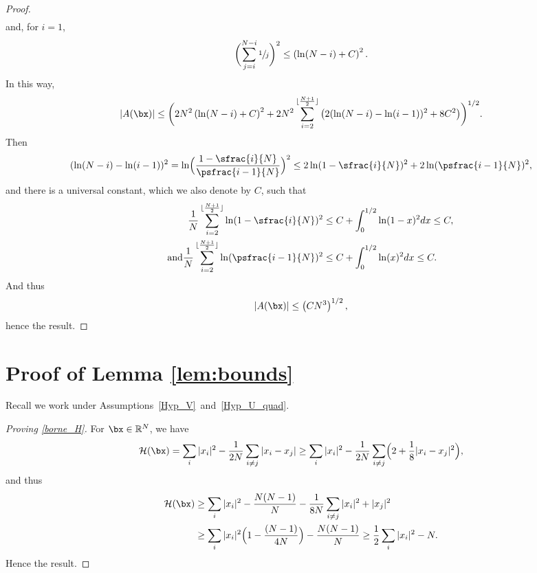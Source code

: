 \begin{proof}
\begin{align*}
\end{align*}
and, for $i=1$,\vspace*{-5pt}
\begin{align*}
\biggl(\sum_{j=i}^{N-i}\sfrac{1}{j}\biggr)^2\leq\left(\ln(N-i)+C\right)^2.
\end{align*}
In this way,\vspace*{-5pt}
\[
|A(\bx)|\leq\biggl(2N^2\left(\ln(N-i)+C\right)^2
+2N^2\sum_{i=2}^{\lfloor\frac{N+1}{2}\rfloor}\left(2(\ln(N-i)-\ln(i-1))^2+8C^2\right)\biggr)^{1/2}.
\]
Then\vspace*{-5pt}
\begin{align*}
(\ln(N-i)-\ln(i-1))^2=\ln\Bigl(\frac{1-\sfrac{i}{N}}{\psfrac{i-1}{N}}\Bigr)^2\leq 2\ln(1-\sfrac{i}{N})^2+2\ln(\psfrac{i-1}{N})^2,
\end{align*}
and there is a universal constant, which we also denote by $C$, such that
\begin{align*}
\frac{1}{N}\sum_{i=2}^{\lfloor\frac{N+1}{2}\rfloor}\ln(1-\sfrac{i}{N})^2&\leq C+\int_{0}^{1/2}\ln(1-x)^2dx\leq C,
\\
\tag*{and}
\frac{1}{N}\sum_{i=2}^{\lfloor\frac{N+1}{2}\rfloor}\ln(\psfrac{i-1}{N})^2&\leq C+\int_{0}^{1/2}\ln(x)^2dx\leq C.
\end{align*}
And thus\vspace*{-5pt}
\begin{align*}
|A(\bx)|\leq\left(CN^3\right)^{1/2},
\end{align*}
hence the result.
\end{proof}

\section{Proof of Lemma \ref{lem:bounds}}\label{proof_lem_bounds}

Recall we work under Assumptions~\ref{Hyp_V}~and~\ref{Hyp_U_quad}.

\begin{proof}[Proving \eqref{borne_H}] For $\bx\in\mathbb{R}^N$, we have\vspace*{-3pt}
\[
\mathcal{H}(\bx)=\sum_{i}|x_i|^2-\frac{1}{2N}\sum_{i\neq j}|x_i-x_j|\geq\sum_{i}|x_i|^2-\frac{1}{2N}\sum_{i\neq j}\Bigl(2+\frac{1}{8}|x_i-x_j|^2\Bigr),
\]
and thus
\begin{align*}
\mathcal{H}(\bx)&\geq\sum_{i}|x_i|^2-\frac{N(N-1)}{N}-\frac{1}{8N}\sum_{i\neq j}|x_i|^2+|x_j|^2\\
&\geq\sum_{i}|x_i|^2\Bigl(1-\frac{(N-1)}{4N}\Bigr)-\frac{N(N-1)}{N}\geq\frac{1}{2}\sum_{i}|x_i|^2-N.
\end{align*}
Hence the result.
\end{proof}

